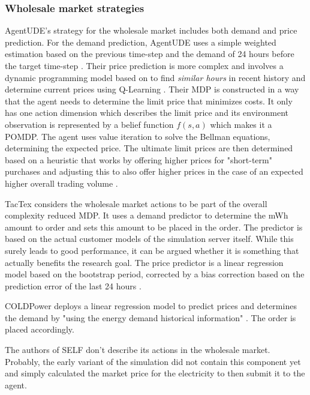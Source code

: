 \subsubsection{Wholesale market strategies}%
\label{ssub:wholesale_market_strategies}


AgentUDE's strategy for the wholesale market includes both demand and price prediction. For the demand prediction, AgentUDE
uses a simple weighted estimation based on the previous time-step and the demand of 24 hours before the target time-step
\cite[]{ozdemir2015winner}. Their price prediction is more complex and involves a dynamic programming model based on
\cite[]{tesauro2002strategic} to find \emph{similar hours} in recent history and determine current prices using
Q-Learning \cite[]{ozdemir2017strategy}. Their \ac{MDP} is constructed in a way that the agent needs to determine the
limit price that minimizes costs. It only has one action dimension which describes the limit price and its environment
observation is represented by a belief function $f(s,a)$ which makes it a \ac{POMDP}. The agent uses value iteration to
solve the Bellman equations, determining the expected price. The ultimate limit prices are then determined based on a
heuristic that works by offering higher prices for "short-term" purchases and adjusting this to also offer higher prices
in the case of an expected higher overall trading volume \cite[]{ozdemir2017strategy}.

TacTex considers the wholesale market actions to be part of the overall complexity reduced \ac{MDP}. It uses a demand
predictor to determine the \ac{mWh} amount to order and sets this amount to be placed in the order. The
predictor is based on the actual customer models of the simulation server itself. While this surely leads to good
performance, it can be argued whether it is something that actually benefits the research goal. The price predictor is
a linear regression model based on the bootstrap period, corrected by a bias correction based on the prediction error of
the last 24 hours \cite[]{tactexurieli2016mdp}.

COLDPower deploys a linear regression model to predict prices and determines the demand by "using the energy demand
historical information" \cite[]{cuevas2015distributed}. The order is placed accordingly.

The authors of \ac{SELF} don't describe its actions in the wholesale market. Probably, the early variant of the
simulation did not contain this component yet and simply calculated the market price for the
electricity to then submit it to the agent.


